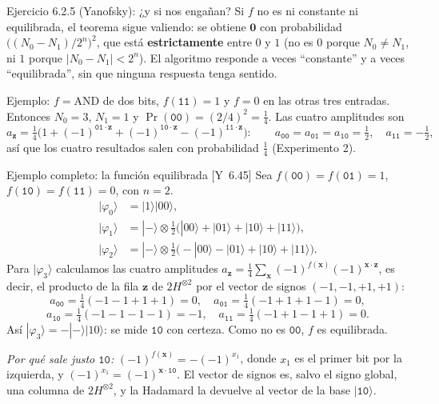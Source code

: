 \documentclass[11pt, a4paper, twoside, openright]{report}
\providecommand{\ket}[1]{|#1\rangle}
\newcommand{\bx}{\mathbf{x}}
\newcommand{\bz}{\mathbf{z}}
\newcommand{\bcero}{\mathbf{0}}
\newcommand{\Yan}[1]{\textcolor{rosaviejo}{\small[Y~#1]}}  %
\begin{document}
\begin{ejercicio}{Ejercicio 6.2.5 (Yanofsky): ¿y si nos engañan?}
Si $f$ no es ni constante ni equilibrada, el teorema sigue valiendo: se obtiene $\bcero$ con probabilidad $\big((N_0 - N_1)/2^n\big)^2$, que está \textbf{estrictamente} entre $0$ y $1$ (no es $0$ porque $N_0\neq N_1$, ni $1$ porque $|N_0-N_1| < 2^n$). El algoritmo responde a veces ``constante'' y a veces ``equilibrada'', sin que ninguna respuesta tenga sentido.

Ejemplo: $f = \mathrm{AND}$ de dos bits, $f(\texttt{11}) = 1$ y $f = 0$ en las otras tres entradas. Entonces $N_0 = 3$, $N_1 = 1$ y $\Pr(\texttt{00}) = (2/4)^2 = \frac14$. Las cuatro amplitudes son
\[ a_{\bz} = \tfrac14\big(1 + (-1)^{\texttt{01}\cdot\bz} + (-1)^{\texttt{10}\cdot\bz} - (-1)^{\texttt{11}\cdot\bz}\big): \qquad a_{\texttt{00}} = a_{\texttt{01}} = a_{\texttt{10}} = \tfrac12, \quad a_{\texttt{11}} = -\tfrac12, \]
así que los cuatro resultados salen con probabilidad $\frac14$ (Experimento 2).
\end{ejercicio}

\begin{ejemplo}{Ejemplo completo: la función equilibrada \Yan{6.45}}
Sea $f(\texttt{00}) = f(\texttt{01}) = 1$, $f(\texttt{10}) = f(\texttt{11}) = 0$, con $n = 2$.
\begin{align*}
\ket{\varphi_0} &= \ket{1}\ket{00}, \\
\ket{\varphi_1} &= \ket{-}\otimes\tfrac12\big(\ket{00}+\ket{01}+\ket{10}+\ket{11}\big), \\
\ket{\varphi_2} &= \ket{-}\otimes\tfrac12\big(-\ket{00}-\ket{01}+\ket{10}+\ket{11}\big).
\end{align*}
Para $\ket{\varphi_3}$ calculamos las cuatro amplitudes $a_{\bz} = \frac14\sum_{\bx}(-1)^{f(\bx)}(-1)^{\bx\cdot\bz}$, es decir, el producto de la fila $\bz$ de $2H^{\otimes2}$ por el vector de signos $(-1,-1,+1,+1)$:
\[
a_{\texttt{00}} = \tfrac14(-1-1+1+1) = 0, \quad
a_{\texttt{01}} = \tfrac14(-1+1+1-1) = 0, \]
\[
a_{\texttt{10}} = \tfrac14(-1-1-1-1) = -1, \quad
a_{\texttt{11}} = \tfrac14(-1+1-1+1) = 0.
\]
Así $\ket{\varphi_3} = -\ket{-}\ket{10}$: se mide $\texttt{10}$ con certeza. Como no es $\texttt{00}$, $f$ es equilibrada.

\textit{Por qué sale justo $\texttt{10}$:} $(-1)^{f(\bx)} = -(-1)^{x_1}$, donde $x_1$ es el primer bit por la izquierda, y $(-1)^{x_1} = (-1)^{\bx\cdot\texttt{10}}$. El vector de signos es, salvo el signo global, una columna de $2H^{\otimes2}$, y la Hadamard la devuelve al vector de la base $\ket{\texttt{10}}$.
\end{ejemplo}
\end{document}
